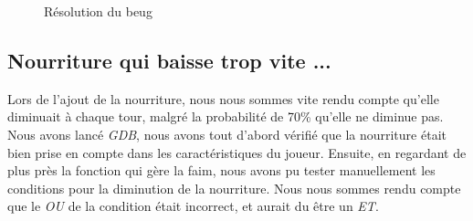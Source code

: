 \documentclass[11pt]{report}
\begin{document}
	\newpage

			\begin{figure}[ht]
			    \centering
			    \qquad
			    \caption{Résolution du beug}%
			\end{figure}
		
		\newpage
	\subsection*{Nourriture qui baisse trop vite ...}
		Lors de l'ajout de la nourriture, nous nous sommes vite rendu compte qu'elle diminuait à chaque tour, malgré la probabilité de 70\% qu'elle ne diminue pas. Nous avons lancé \emph{GDB}, nous avons tout d'abord vérifié que la nourriture était bien prise en compte dans les caractéristiques du joueur. Ensuite, en regardant de plus près la fonction qui gère la faim, nous avons pu tester manuellement les conditions pour la diminution de la nourriture. Nous nous sommes rendu compte que le \emph{OU} de la condition était incorrect, et aurait du être un \emph{ET}.
		
\end{document}
